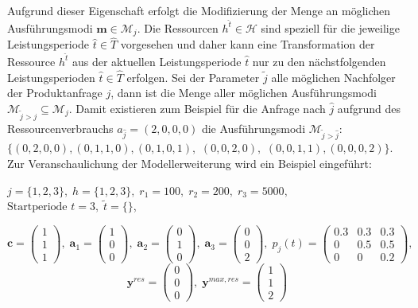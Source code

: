 Aufgrund dieser Eigenschaft erfolgt die Modifizierung der Menge an möglichen Ausführungsmodi $\textbf{m}\in\mathcal{M}_{j}$. Die Ressourcen $h^{\hat{t}}\in\mathcal{H}$ sind speziell für die jeweilige Leistungsperiode $\hat{t}\in \hat{T}$ vorgesehen und daher kann eine Transformation der Ressource $h^{\hat{t}}$ aus der aktuellen Leistungsperiode $\hat{t}$ nur zu den nächstfolgenden Leistungsperioden $\hat{t}\in \hat{T}$ erfolgen. Sei der Parameter $\tilde{j}$ alle möglichen Nachfolger der Produktanfrage $j$, dann ist die Menge aller möglichen Ausführungsmodi $\mathcal{M}_{\tilde{j}>j}\subseteq\mathcal{M}_j$. Damit existieren zum Beispiel für die Anfrage nach $\hat{j}$ aufgrund des Ressourcenverbrauchs $a_{\hat{j}}=(2,0,0,0)$ die Ausführungsmodi $\mathcal{M}_{\tilde{j}>\hat{j}}$: $\{ (0 ,2, 0, 0), (0, 1, 1, 0), (0, 1, 0, 1),$ $(0, 0, 2, 0),$ $(0, 0, 1, 1), (0, 0, 0, 2)\}$. Zur Veranschaulichung der Modellerweiterung wird ein Beispiel eingeführt:

\begin{center}
$j = \{1, 2, 3\}, \; h = \{1,2,3\}, \; r_{1} = 100, \; r_{2} = 200, \; r_{3} = 5000,$ \\
$\text{Startperiode } t=3, \; \tilde{t}=\{\} $,
\end{center}
\[
    \textbf{c}=\begin{pmatrix} 1\\ 1\\ 1  \end{pmatrix}, \;
    \textbf{a}_{1}=\begin{pmatrix} 1\\ 0\\ 0  \end{pmatrix}, \;
     \textbf{a}_{2}=\begin{pmatrix} 0\\ 1\\ 0  \end{pmatrix}, \;
       \textbf{a}_{3}=\begin{pmatrix} 0\\ 0\\ 2  \end{pmatrix}, \;
            p_{j}(t)=
       \begin{pmatrix}
       0.3 & 0.3 & 0.3 \\
0 & 0.5 & 0.5 \\
0 & 0 & 0.2
\end{pmatrix}, 
  \]
  \[
    \textbf{y}^{res}= \begin{pmatrix} 0\\ 0\\ 0  \end{pmatrix}, \;
    \textbf{y}^{max,res}=\begin{pmatrix} 1\\ 1\\ 2  \end{pmatrix}
      \]


